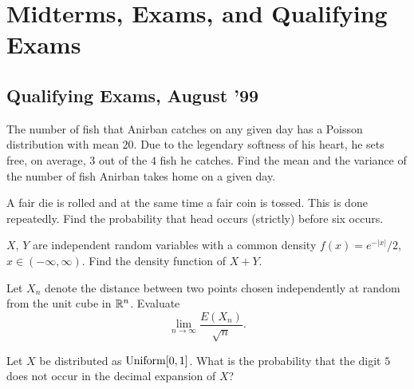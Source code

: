 \chapter{Midterms, Exams, and Qualifying Exams}
\section{Qualifying Exams, August '99}
\begin{problem}
  The number of fish that Anirban catches on any given day has a Poisson
  distribution with mean \(20\). Due to the legendary softness of his
  heart, he sets free, on average, \(3\) out of the \(4\) fish he
  catches. Find the mean and the variance of the number of fish Anirban
  takes home on a given day.
\end{problem}
\begin{solution}
\end{solution}

\begin{problem}
  A fair die is rolled and at the same time a fair coin is tossed. This is
  done repeatedly. Find the probability that head occurs (strictly) before
  six occurs.
\end{problem}
\begin{solution}
\end{solution}

\begin{problem}
  \(X\), \(Y\) are independent random variables with a common density
  \(f(x)=e^{-|x|}/2\), \(x\in(-\infty,\infty)\). Find the density function
  of \(X+Y\).
\end{problem}
\begin{solution}
\end{solution}

\begin{problem}
  Let \(X_n\) denote the distance between two points chosen independently
  at random from the unit cube in \(\mathbb{R}^n\). Evaluate
  \[
    \lim_{n\to\infty}\frac{E(X_n)}{\sqrt{n}}.
  \]
\end{problem}
\begin{solution}
\end{solution}

\begin{problem}
  Let \(X\) be distributed as \(\operatorname{Uniform}[0,1]\). What is the probability
  that the digit \(5\) does not occur in the decimal expansion of \(X\)?
\end{problem}
\begin{solution}
\end{solution}

